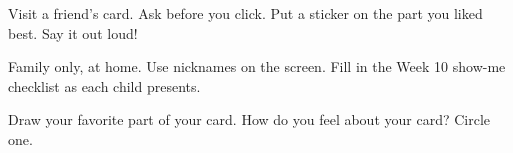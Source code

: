 \begin{exercise}
Visit a friend's card. Ask before you click. Put a sticker on the part you liked best. Say it out loud!
\begin{center}
\end{center}
\end{exercise}

\begin{grownup}
Family only, at home. Use nicknames on the screen. Fill in the Week 10 show-me checklist as each child presents.
\end{grownup}

\begin{vocab}
\end{vocab}

\begin{reflection}
Draw your favorite part of your card. How do you feel about your card? Circle one.

\begin{center}
\Huge\faSmile[regular]\qquad\faMeh[regular]\qquad\faFrown[regular]
\end{center}
\answerspace{3.5cm}
\end{reflection}

